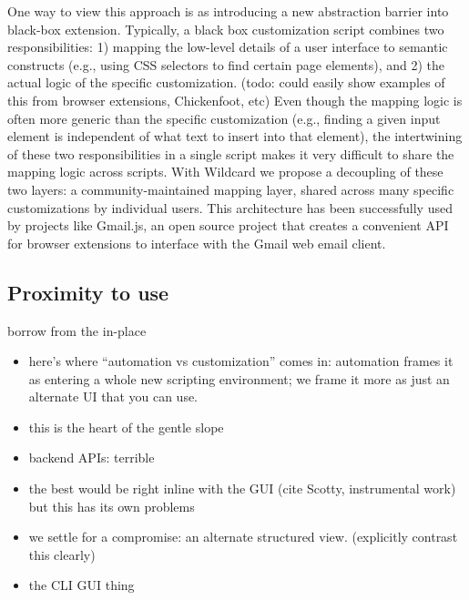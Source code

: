 \documentclass[sigplan,10pt,anonymous,review]{acmart}
\providecommand{\tightlist}{%
  \setlength{\itemsep}{0pt}\setlength{\parskip}{0pt}}
\begin{document}
One way to view this approach is as introducing a new abstraction
barrier into black-box extension. Typically, a black box customization
script combines two responsibilities: 1) mapping the low-level details
of a user interface to semantic constructs (e.g., using CSS selectors to
find certain page elements), and 2) the actual logic of the specific
customization. (todo: could easily show examples of this from browser
extensions, Chickenfoot, etc) Even though the mapping logic is often
more generic than the specific customization (e.g., finding a given
input element is independent of what text to insert into that element),
the intertwining of these two responsibilities in a single script makes
it very difficult to share the mapping logic across scripts. With
Wildcard we propose a decoupling of these two layers: a
community-maintained mapping layer, shared across many specific
customizations by individual users. This architecture has been
successfully used by projects like Gmail.js, an open source project that
creates a convenient API for browser extensions to interface with the
Gmail web email client.

\hypertarget{proximity-to-use}{%
\subsection{Proximity to use}\label{proximity-to-use}}

borrow from the in-place

\begin{itemize}
\tightlist
\item
  here's where ``automation vs customization'' comes in: automation
  frames it as entering a whole new scripting environment; we frame it
  more as just an alternate UI that you can use.
\item
  this is the heart of the gentle slope
\item
  backend APIs: terrible
\item
  the best would be right inline with the GUI (cite Scotty, instrumental
  work) but this has its own problems
\item
  we settle for a compromise: an alternate structured view. (explicitly
  contrast this clearly)
\item
  the CLI GUI thing
\end{itemize}

\end{document}
